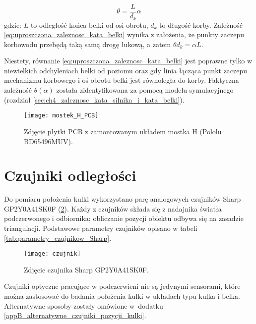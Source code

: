 \begin{equation}\label{eq:uproszczona_zaleznosc_kata_belki}
    \theta = \frac{L}{d_k} \alpha
\end{equation}
gdzie: $L$ to odległość końca belki od osi obrotu, $d_k$ to długość korby. Zależność \eqref{eq:uproszczona_zaleznosc_kata_belki} wynika z założenia, że punkty zaczepu korbowodu przebędą taką samą drogę łukową, a zatem $\theta d_k = \alpha L$.

Niestety, równanie \eqref{eq:uproszczona_zaleznosc_kata_belki} jest poprawne tylko w niewielkich odchyleniach belki od poziomu oraz gdy linia łącząca punkt zaczepu mechanizmu korbowego i oś obrotu belki jest równoległa do korby. Faktyczna zależność $\theta(\alpha)$ została zidentyfikowana za pomocą modelu symulacyjnego (rozdział \ref{sec:ch4_zaleznosc_kata_silnika_i_kata_belki}).

\begin{figure}[H]
    \centering
    \texttt{[image: mostek\_H\_PCB]}
    \caption{Zdjęcie płytki PCB z zamontowanym układem mostka H (Pololu BD65496MUV).}
    \label{fig:mostek_H_PCB}
\end{figure}

\section{Czujniki odległości}
\label{sec:ch3_czujniki_odleglosci}

Do pomiaru położenia kulki wykorzystano parę analogowych czujników Sharp GP2Y0A41SK0F (\cref{fig:czujnik_sharp}). Każdy z czujników składa się z nadajnika światła podczerwonego i odbiornika; obliczanie pozycji obiektu odbywa się na zasadzie triangulacji. Podstawowe parametry czujników opisano w tabeli \ref{tab:parametry_czujnikow_Sharp}.

\begin{figure}[h]
    \centering
    \texttt{[image: czujnik]}
    \caption{Zdjęcie czujnika Sharp GP2Y0A41SK0F.}
    \label{fig:czujnik_sharp}
\end{figure}

Czujniki optyczne pracujące w podczerwieni nie są jedynymi sensorami, które można zastosować do badania położenia kulki w układach typu kulka i belka. Alternatywne sposoby zostały omówione w~dodatku \ref{appB_alternatywne_czujniki_pozycji_kulki}.

